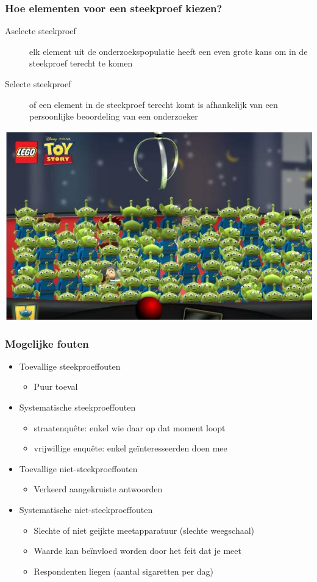 \documentclass{beamer}
\begin{document}
\begin{frame}
  \frametitle{Hoe elementen voor een steekproef kiezen?}

  \begin{description}
    \item[Aselecte steekproef] elk element uit de onderzoekspopulatie heeft een even grote kans om in de steekproef terecht te komen
    \item[Selecte steekproef] of een element in de steekproef terecht komt is afhankelijk van een persoonlijke beoordeling van een onderzoeker
  \end{description}

  \begin{center}
    \includegraphics[width=.5\textwidth]{img/les4-aselect}
  \end{center}
\end{frame}

\begin{frame}
  \frametitle{Mogelijke fouten}

  \begin{itemize}
    \item<+-> Toevallige steekproeffouten
      \begin{itemize}
        \item Puur toeval
      \end{itemize}
    \item<+-> Systematische steekproeffouten
      \begin{itemize}
        \item straatenquête: enkel wie daar op dat moment loopt
        \item vrijwillige enquête: enkel geïnteresseerden doen mee
      \end{itemize}
    \item<+-> Toevallige niet-steekproeffouten
      \begin{itemize}
        \item Verkeerd aangekruiste antwoorden
      \end{itemize}
    \item<+-> Systematische niet-steekproeffouten
      \begin{itemize}
        \item Slechte of niet geijkte meetapparatuur (slechte weegschaal)
        \item Waarde kan beïnvloed worden door het feit dat je meet
        \item Respondenten liegen (aantal sigaretten per dag)
      \end{itemize}
  \end{itemize}
\end{frame}
\end{document}
